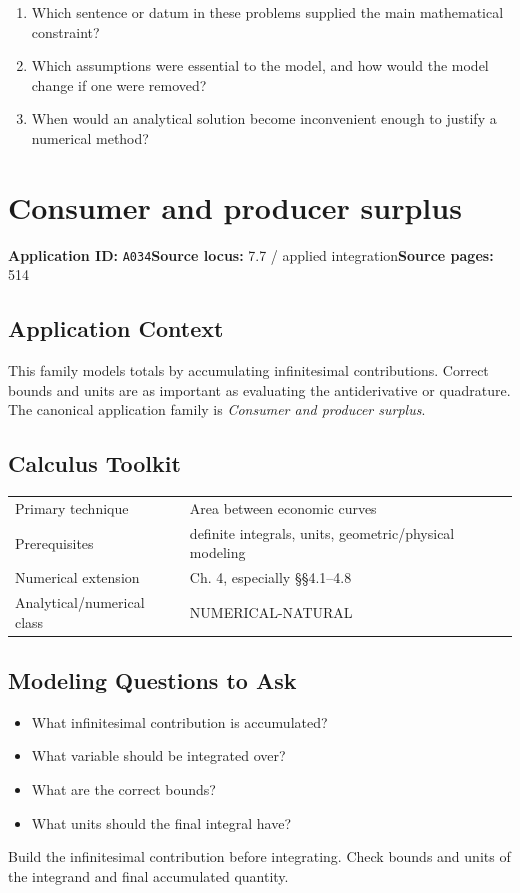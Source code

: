 \documentclass[11pt]{book}
\newcommand{\pid}[1]{\texttt{#1}}
\begin{document}
\begin{reflectionbox}\begin{enumerate}
\item Which sentence or datum in these problems supplied the main mathematical constraint?
\item Which assumptions were essential to the model, and how would the model change if one were removed?
\item When would an analytical solution become inconvenient enough to justify a numerical method?
\end{enumerate}\end{reflectionbox}
\chapter{Consumer and producer surplus}\label{app:A034}
\textbf{Application ID:} \pid{A034}\quad \textbf{Source locus:} 7.7 / applied integration\quad \textbf{Source pages:} 514
\section*{Application Context}
This family models totals by accumulating infinitesimal contributions. Correct bounds and units are as important as evaluating the antiderivative or quadrature. The canonical application family is \emph{Consumer and producer surplus}.
\section*{Calculus Toolkit}
\begin{tabularx}{\textwidth}{@{}lX@{}}\toprule
Primary technique & Area between economic curves \\
Prerequisites & definite integrals, units, geometric/physical modeling \\
Numerical extension & Ch. 4, especially §§4.1–4.8 \\
Analytical/numerical class & NUMERICAL-NATURAL \\
\bottomrule\end{tabularx}
\section*{Modeling Questions to Ask}\begin{itemize}
\item What infinitesimal contribution is accumulated?
\item What variable should be integrated over?
\item What are the correct bounds?
\item What units should the final integral have?
\end{itemize}
\begin{errorbox}Build the infinitesimal contribution before integrating. Check bounds and units of the integrand and final accumulated quantity.\end{errorbox}
\end{document}
